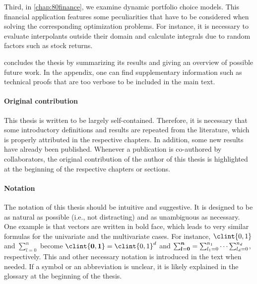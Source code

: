 Third, in \cref{chap:80finance},
we examine dynamic portfolio choice models.
This financial application features some peculiarities that have
to be considered when solving the corresponding optimization problems.
For instance, it is necessary to evaluate interpolants outside their domain
and calculate integrals due to random factors such as stock returns.

 concludes the thesis by
summarizing its results and giving an overview of possible future work.
In the appendix, one can find supplementary information such as
technical proofs that are too verbose to be included in the main text.

\paragraph{Original contribution}

This thesis is written to be largely self-contained.
Therefore, it is necessary that some introductory definitions and
results are repeated from the literature,
which is properly attributed in the respective chapters.
In addition, some new results have already been published.
Whenever a publication is co-authored by collaborators,
the original contribution of the author of this thesis is highlighted
at the beginning of the respective chapters or sections.

\paragraph{Notation}

The notation of this thesis should be intuitive and suggestive.
It is designed to be as natural as possible (i.e., not distracting)
and as unambiguous as necessary.
One example is that vectors are written in bold face, which leads to
very similar formulas for the univariate and the multivariate cases.
For instance, $\clint{0, 1}$ and $\sum_{l=0}^n$
become
$\clint{\*0, \*1} = \clint{0, 1}^d$ and
$\sum_{{\boldsymbol{l}}={\boldsymbol{0}}}^{{\boldsymbol{n}}} = \sum_{l_1=0}^{n_1} \dotsb \sum_{l_d=0}^{n_d}$,
respectively.
This and other necessary notation is introduced in the text when needed.
If a symbol or an abbreviation is unclear,
it is likely explained in the glossary at the beginning of the thesis.

\cleardoublepage
